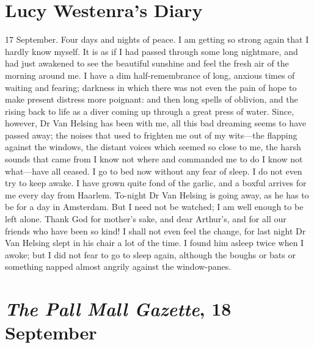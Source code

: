 \section{Lucy Westenra's Diary}

\begin{diary}{17 September.}
Four days and nights of peace. I am getting so strong again that I hardly know myself. It is as if I had passed through some long nightmare, and had just awakened to see the beautiful sunshine and feel the fresh air of the morning around me. I have a dim half-remembrance of long, anxious times of waiting and fearing; darkness in which there was not even the pain of hope to make present distress more poignant: and then long spells of oblivion, and the rising back to life as a diver coming up through a great press of water. Since, however, Dr Van Helsing has been with me, all this bad dreaming seems to have passed away; the noises that used to frighten me out of my wits—the flapping against the windows, the distant voices which seemed so close to me, the harsh sounds that came from I know not where and commanded me to do I know not what—have all ceased. I go to bed now without any fear of sleep. I do not even try to keep awake. I have grown quite fond of the garlic, and a boxful arrives for me every day from Haarlem. To-night Dr Van Helsing is going away, as he has to be for a day in Amsterdam. But I need not be watched; I am well enough to be left alone. Thank God for mother's sake, and dear Arthur's, and for all our friends who have been so kind! I shall not even feel the change, for last night Dr Van Helsing slept in his chair a lot of the time. I found him asleep twice when I awoke; but I did not fear to go to sleep again, although the boughs or bats or something napped almost angrily against the window-panes.
\end{diary}

\section{\emph{The Pall Mall Gazette}, 18 September} %


